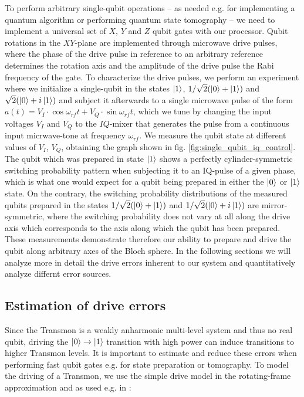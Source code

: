 To perform arbitrary single-qubit operations -- as needed e.g. for implementing a quantum algorithm or performing quantum state tomography -- we need to implement a universal set of $X$, $Y$ and $Z$ qubit gates with our processor. Qubit rotations in the $XY$-plane are implemented through microwave drive pulses, where the phase of the drive pulse in reference to an arbitrary reference determines the rotation axis and the amplitude of the drive pulse the Rabi frequency of the gate. To characterize the drive pulses, we perform an experiment where we initialize a single-qubit in the states $\left| 1 \right>$, $1/\sqrt{2}(\left| 0 \right>+\left| 1 \right>)$ and $\sqrt{2}(\left| 0 \right>+i\left| 1 \right>)$ and subject it afterwards to a single microwave pulse of the form $a(t) = V_I\cdot\cos{\omega_{rf}t}+V_Q\cdot\sin{\omega_{rf}t}$, which we tune by changing the input voltages $V_I$ and $V_Q$ to the $IQ$-mixer that generates the pulse from a continuous input micrwave-tone at frequency $\omega_{rf}$. We measure the qubit state at different values of $V_I$, $V_Q$, obtaining the graph shown in fig. \ref{fig:single_qubit_iq_control}. The qubit which was prepared in state $\left| 1 \right>$ shows a perfectly cylinder-symmetric switching probability pattern when subjecting it to an IQ-pulse of a given phase, which is what one would expect for a qubit being prepared in either the $\left| 0 \right>$ or $\left| 1 \right>$ state. On the contrary, the switching probability distributions of the measured qubits prepared in the states $1/\sqrt{2}(\left| 0 \right>+\left| 1 \right>)$ and $1/\sqrt{2}(\left| 0 \right>+i\left| 1 \right>)$ are mirror-symmetric, where the switching probability does not vary at all along the drive axis which corresponds to the axis along which the qubit has been prepared. These measurements demonstrate therefore our ability to prepare and drive the qubit along arbitrary axes of the Bloch sphere. In the following sections we will analyze more in detail the drive errors inherent to our system and quantitatively analyze differnt error sources. 

\subsection{Estimation of drive errors}

Since the Transmon is a weakly anharmonic multi-level system and thus no real qubit, driving the $\left| 0 \right>\to\left| 1 \right>$ transition with high power can induce transitions to higher Transmon levels. It is important to estimate and reduce these errors when performing fast qubit gates e.g. for state preparation or tomography. To model the driving of a Transmon, we use the simple drive model in the rotating-frame approximation and as used e.g. in \cite{motzoi_simple_2009}:

